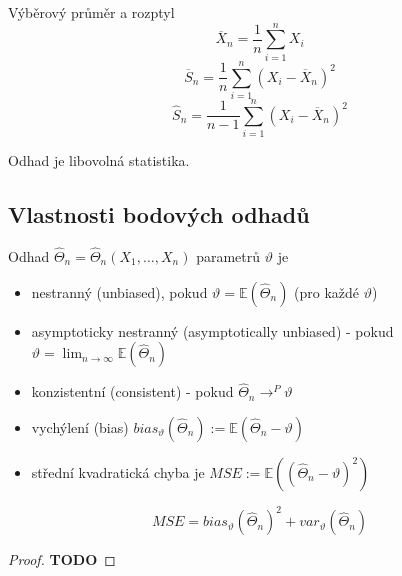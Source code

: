 \documentclass[../main.tex]{subfiles}
\begin{document}
\begin{example}
    Výběrový průměr a rozptyl\\
    \[\overline{X}_n = \frac{1}{n}\sum^n_{i=1}X_i\]
    \[\overline{S}_n = \frac{1}{n}\sum^n_{i=1}(X_i - \overline{X}_n)^2\]
    \[\widehat{S}_n = \frac{1}{n-1}\sum^n_{i=1}(X_i - \overline{X}_n)^2 \]
\end{example}
\begin{definition}
    Odhad je libovolná statistika.
\end{definition}

\subsection{Vlastnosti bodových odhadů}
\begin{definition}
    Odhad $\widehat{\Theta}_n = \widehat{\Theta}_n(X_1,\dots,X_n)$ parametrů $\vartheta$ je
    \begin{itemize}
        \item nestranný (unbiased), pokud $\vartheta = \mathbb{E}(\widehat{\Theta}_n)$ (pro každé $\vartheta$)
        \item asymptoticky nestranný (asymptotically unbiased) - pokud $\vartheta = \lim_{n \rightarrow \infty} \mathbb{E}(\widehat{\Theta}_n)$
        \item konzistentní (consistent) - pokud $\widehat{\Theta}_n \rightarrow^P \vartheta$
        \item vychýlení (bias) $bias_\vartheta (\widehat{\Theta}_n):=\mathbb{E}(\widehat{\Theta}_n - \vartheta)$
        \item střední kvadratická chyba je $MSE := \mathbb{E}((\widehat{\Theta}_n - \vartheta)^2)$
    \end{itemize}
\end{definition}
\begin{theorem}
    \[MSE = bias_\vartheta(\widehat{\Theta}_n)^2 + var_\vartheta(\widehat{\Theta}_n)\]
    \begin{proof}
        \textbf{TODO}
    \end{proof}
\end{theorem}
\end{document}
